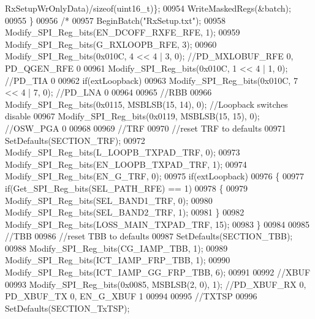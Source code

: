 \begin{DoxyCode}
{{{{{{{{{{{{{{{{{{{{      RxSetupWrOnlyData)/\textcolor{keyword}{sizeof}(uint16\_t)\};
00954         WriteMaskedRegs(&batch);
00955     \}
00956     \textcolor{comment}{/*}
00957 \textcolor{comment}{    BeginBatch("RxSetup.txt");}
00958 \textcolor{comment}{    Modify\_SPI\_Reg\_bits(EN\_DCOFF\_RXFE\_RFE, 1);}
00959 \textcolor{comment}{    Modify\_SPI\_Reg\_bits(G\_RXLOOPB\_RFE, 3);}
00960 \textcolor{comment}{    Modify\_SPI\_Reg\_bits(0x010C, 4 << 4 | 3, 0); //PD\_MXLOBUF\_RFE 0, PD\_QGEN\_RFE 0}
00961 \textcolor{comment}{    Modify\_SPI\_Reg\_bits(0x010C, 1 << 4 | 1, 0); //PD\_TIA 0}
00962 \textcolor{comment}{    if(extLoopback)}
00963 \textcolor{comment}{        Modify\_SPI\_Reg\_bits(0x010C, 7 << 4 | 7, 0); //PD\_LNA 0}
00964 \textcolor{comment}{}
00965 \textcolor{comment}{    //RBB}
00966 \textcolor{comment}{    Modify\_SPI\_Reg\_bits(0x0115, MSBLSB(15, 14), 0); //Loopback switches disable}
00967 \textcolor{comment}{    Modify\_SPI\_Reg\_bits(0x0119, MSBLSB(15, 15), 0); //OSW\_PGA 0}
00968 \textcolor{comment}{}
00969 \textcolor{comment}{    //TRF}
00970 \textcolor{comment}{    //reset TRF to defaults}
00971 \textcolor{comment}{    SetDefaults(SECTION\_TRF);}
00972 \textcolor{comment}{    Modify\_SPI\_Reg\_bits(L\_LOOPB\_TXPAD\_TRF, 0);}
00973 \textcolor{comment}{    Modify\_SPI\_Reg\_bits(EN\_LOOPB\_TXPAD\_TRF, 1);}
00974 \textcolor{comment}{    Modify\_SPI\_Reg\_bits(EN\_G\_TRF, 0);}
00975 \textcolor{comment}{    if(extLoopback)}
00976 \textcolor{comment}{    \{}
00977 \textcolor{comment}{        if(Get\_SPI\_Reg\_bits(SEL\_PATH\_RFE) == 1)}
00978 \textcolor{comment}{        \{}
00979 \textcolor{comment}{            Modify\_SPI\_Reg\_bits(SEL\_BAND1\_TRF, 0);}
00980 \textcolor{comment}{            Modify\_SPI\_Reg\_bits(SEL\_BAND2\_TRF, 1);}
00981 \textcolor{comment}{        \}}
00982 \textcolor{comment}{        Modify\_SPI\_Reg\_bits(LOSS\_MAIN\_TXPAD\_TRF, 15);}
00983 \textcolor{comment}{    \}}
00984 \textcolor{comment}{}
00985 \textcolor{comment}{    //TBB}
00986 \textcolor{comment}{    //reset TBB to defaults}
00987 \textcolor{comment}{    SetDefaults(SECTION\_TBB);}
00988 \textcolor{comment}{    Modify\_SPI\_Reg\_bits(CG\_IAMP\_TBB, 1);}
00989 \textcolor{comment}{    Modify\_SPI\_Reg\_bits(ICT\_IAMP\_FRP\_TBB, 1);}
00990 \textcolor{comment}{    Modify\_SPI\_Reg\_bits(ICT\_IAMP\_GG\_FRP\_TBB, 6);}
00991 \textcolor{comment}{}
00992 \textcolor{comment}{    //XBUF}
00993 \textcolor{comment}{    Modify\_SPI\_Reg\_bits(0x0085, MSBLSB(2, 0), 1); //PD\_XBUF\_RX 0, PD\_XBUF\_TX 0, EN\_G\_XBUF 1}
00994 \textcolor{comment}{}
00995 \textcolor{comment}{    //TXTSP}
00996 \textcolor{comment}{    SetDefaults(SECTION\_TxTSP);}
}}}}}}}}}}}}}}}}}}}}
\end{DoxyCode}
